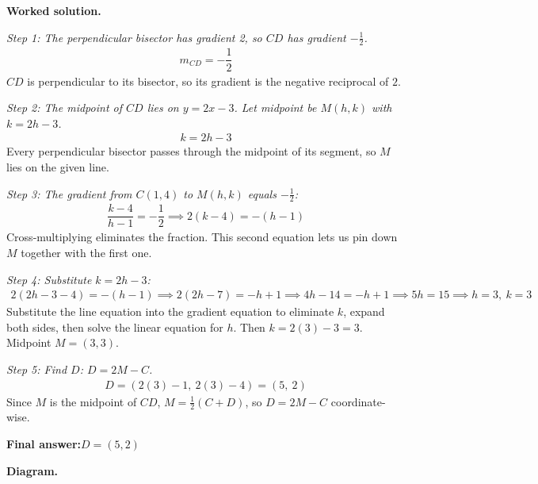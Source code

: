 \documentclass[11pt]{article}
\begin{document}
\textbf{Worked solution.}

\textit{Step 1: The perpendicular bisector has gradient 2, so \( CD \) has gradient \( -\frac{1}{2} \).}
\[\begin{gathered}
m_{CD} = -\dfrac{1}{2}
\end{gathered}\]
\( CD \) is perpendicular to its bisector, so its gradient is the negative reciprocal of \( 2 \).

\textit{Step 2: The midpoint of \( CD \) lies on \( y = 2x - 3 \). Let midpoint be \( M(h, k) \) with \( k = 2h - 3 \).}
\[\begin{gathered}
k = 2h - 3
\end{gathered}\]
Every perpendicular bisector passes through the midpoint of its segment, so \( M \) lies on the given line.

\textit{Step 3: The gradient from \( C(1,4) \) to \( M(h,k) \) equals \( -\frac{1}{2} \):}
\[\begin{gathered}
\dfrac{k - 4}{h - 1} = -\dfrac{1}{2} \implies 2(k - 4) = -(h - 1)
\end{gathered}\]
Cross-multiplying eliminates the fraction. This second equation lets us pin down \( M \) together with the first one.

\textit{Step 4: Substitute \( k = 2h - 3 \):}
\[\begin{gathered}
2(2h - 3 - 4) = -(h - 1) \implies 2(2h - 7) = -h + 1 \implies 4h - 14 = -h + 1 \implies 5h = 15 \implies h = 3,\ k = 3
\end{gathered}\]
Substitute the line equation into the gradient equation to eliminate \( k \), expand both sides, then solve the linear equation for \( h \). Then \( k = 2(3) - 3 = 3 \). Midpoint \( M = (3, 3) \).

\textit{Step 5: Find \( D \): \( D = 2M - C \).}
\[\begin{gathered}
D = (2(3) - 1,\ 2(3) - 4) = (5,\ 2)
\end{gathered}\]
Since \( M \) is the midpoint of \( CD \), \( M = \tfrac{1}{2}(C + D) \), so \( D = 2M - C \) coordinate-wise.

\begin{answerbox}
\textbf{Final answer:}\quad \(\displaystyle D = (5, 2)\)
\end{answerbox}
\textbf{Diagram.}
\end{document}
